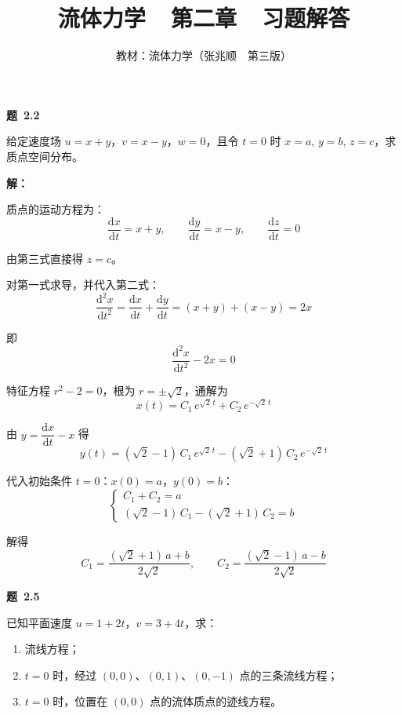 \documentclass[12pt, a4paper]{ctexart}
\title{\vspace{-1cm}\textbf{流体力学~~第二章~~习题解答}}
\author{教材：流体力学（张兆顺~~第三版）}
\date{}
\newenvironment{problem}[1]{%
  \vspace{6pt}
  \noindent\textbf{\large 题~#1}\par\nopagebreak
  \begin{leftbar}\noindent\itshape
}{%
  \end{leftbar}\vspace{2pt}
}
\newcommand{\solution}{\noindent\textbf{解：}\par\nopagebreak}
\newcommand{\result}[1]{\par\vspace{4pt}\noindent\fcolorbox{black}{gray!8}{\parbox{\dimexpr\linewidth-2\fboxsep-2\fboxrule}{#1}}\vspace{4pt}}
\begin{document}
\maketitle
\thispagestyle{empty}

\begin{problem}{2.2}
给定速度场 $u = x + y$，$v = x - y$，$w = 0$，且令 $t = 0$ 时 $x = a,\, y = b,\, z = c$，求质点空间分布。
\end{problem}

\solution

质点的运动方程为：
\[
  \frac{\mathrm{d}x}{\mathrm{d}t} = x + y, \qquad
  \frac{\mathrm{d}y}{\mathrm{d}t} = x - y, \qquad
  \frac{\mathrm{d}z}{\mathrm{d}t} = 0
\]

由第三式直接得 $z = c$。

对第一式求导，并代入第二式：
\[
  \frac{\mathrm{d}^2 x}{\mathrm{d}t^2}
  = \frac{\mathrm{d}x}{\mathrm{d}t} + \frac{\mathrm{d}y}{\mathrm{d}t}
  = (x + y) + (x - y) = 2x
\]

即
\[
  \frac{\mathrm{d}^2 x}{\mathrm{d}t^2} - 2x = 0
\]

特征方程 $r^2 - 2 = 0$，根为 $r = \pm\sqrt{2}$，通解为
\[
  x(t) = C_1\, e^{\sqrt{2}\,t} + C_2\, e^{-\sqrt{2}\,t}
\]

由 $y = \dfrac{\mathrm{d}x}{\mathrm{d}t} - x$ 得
\[
  y(t) = (\sqrt{2} - 1)\,C_1\, e^{\sqrt{2}\,t}
       - (\sqrt{2} + 1)\,C_2\, e^{-\sqrt{2}\,t}
\]

代入初始条件 $t = 0$：$x(0) = a$，$y(0) = b$：
\[
  \begin{cases}
    C_1 + C_2 = a \\[4pt]
    (\sqrt{2} - 1)\,C_1 - (\sqrt{2} + 1)\,C_2 = b
  \end{cases}
\]

解得
\[
  C_1 = \frac{(\sqrt{2}+1)\,a + b}{2\sqrt{2}}, \qquad
  C_2 = \frac{(\sqrt{2}-1)\,a - b}{2\sqrt{2}}
\]

\result{%
\[
  x(t) = \frac{(\sqrt{2}+1)\,a + b}{2\sqrt{2}}\,e^{\sqrt{2}\,t}
       + \frac{(\sqrt{2}-1)\,a - b}{2\sqrt{2}}\,e^{-\sqrt{2}\,t}
\]
\[
  y(t) = \frac{(\sqrt{2}-1)\bigl[(\sqrt{2}+1)\,a + b\bigr]}{2\sqrt{2}}\,e^{\sqrt{2}\,t}
       - \frac{(\sqrt{2}+1)\bigl[(\sqrt{2}-1)\,a - b\bigr]}{2\sqrt{2}}\,e^{-\sqrt{2}\,t}
\]
\[
  z(t) = c
\]
}

\begin{problem}{2.5}
已知平面速度 $u = 1 + 2t$，$v = 3 + 4t$，求：
\begin{enumerate}[label=(\arabic*)]
  \item 流线方程；
  \item $t = 0$ 时，经过 $(0,0)$、$(0,1)$、$(0,-1)$ 点的三条流线方程；
  \item $t = 0$ 时，位置在 $(0,0)$ 点的流体质点的迹线方程。
\end{enumerate}
\end{problem}
\end{document}
